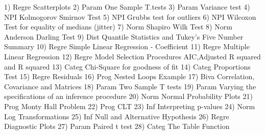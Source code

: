 1) 	Regre	Scatterplots
2) 	Param	One Sample T.tests
3) 	Param	Variance test
4) 	NPI	Kolmogorov Smirnov Test
5) 	NPI	Grubbs test for outliers
6) 	NPI	Wilcoxon Test for equality of medians (jitter)
7) 	Norm	Shapiro Wilk Test
8) 	Norm	Anderson Darling Test
9) 	Dist 	Quantile Statistics and Tukey's Five Number Summary
10)	Regre	Simple Linear Regression - Coefficient
11) 	Regre	Multiple Linear Regression
12) 	Regre	Model Selection Procedures AIC,Adjusted R squared and R squared
13) 	Categ	Chi-Square for goodness of fit
14) 	Categ	Proportions Test
15)	Regre	Residuals
16)	Prog	Nested Loops Example
17) 	Biva	Correlation, Covariance and Matrices
18) 	Param	Two Sample T tests
19) 	Param	Varying the specifications of an inference procedure
20) 	Norm 	Normal Probability Plots
21) 	Prog	Monty Hall Problem
22) 	Prog	CLT
23) 	Inf	Interpreting p-values
24) 	Norm	Log Transformations
25)	Inf	Null and Alternative Hypothesis
26)	Regre	Diagnostic Plots
27) 	Param	Paired t test	
28) 	Categ	The Table Function
